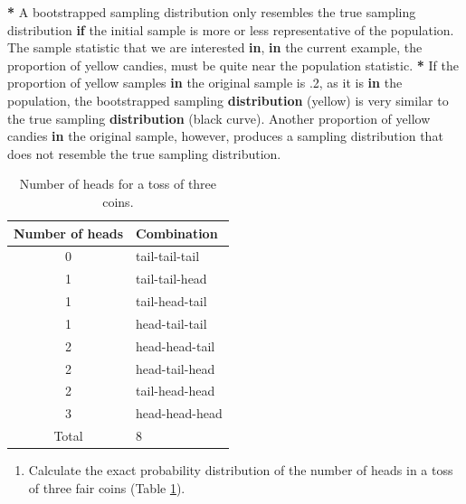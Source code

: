 \documentclass[a4paper]{book}
\newenvironment{Shaded}{\begin{snugshade}}{\end{snugshade}}
\newcommand{\KeywordTok}[1]{\textcolor[rgb]{0,0,0}{\textbf{#1}}}
\newcommand{\DecValTok}[1]{\textcolor[rgb]{0.00,0.00,0.00}{#1}}
\newcommand{\StringTok}[1]{\textcolor[rgb]{0.00,0.00,0.00}{#1}}
\newcommand{\ControlFlowTok}[1]{\textcolor[rgb]{0.00,0.00,0.00}{\textbf{#1}}}
\newcommand{\OperatorTok}[1]{\textcolor[rgb]{0.00,0.00,0.00}{\textbf{#1}}}
\newcommand{\NormalTok}[1]{#1}
\providecommand{\tightlist}{%
  \setlength{\itemsep}{0pt}\setlength{\parskip}{0pt}}
\theoremstyle{definition}
\theoremstyle{definition}
\theoremstyle{definition}
\theoremstyle{remark}
\begin{document}
\begin{Shaded}
\begin{Highlighting}[]
\OperatorTok{*}\StringTok{ }\NormalTok{A bootstrapped sampling distribution only resembles the true sampling}
\NormalTok{distribution }\ControlFlowTok{if}\NormalTok{ the initial sample is more or less representative of the}
\NormalTok{population. The sample statistic that we are interested }\ControlFlowTok{in}\NormalTok{, }\ControlFlowTok{in}\NormalTok{ the current}
\NormalTok{example, the proportion of yellow candies, must be quite near the population}
\NormalTok{statistic.}
\OperatorTok{*}\StringTok{ }\NormalTok{If the proportion of yellow samples }\ControlFlowTok{in}\NormalTok{ the original sample is .}\DecValTok{2}\NormalTok{, as it is}
\ControlFlowTok{in}\NormalTok{ the population, the bootstrapped sampling }\KeywordTok{distribution}\NormalTok{ (yellow) is very}
\NormalTok{similar to the true sampling }\KeywordTok{distribution}\NormalTok{ (black curve). Another proportion of}
\NormalTok{yellow candies }\ControlFlowTok{in}\NormalTok{ the original sample, however, produces a sampling}
\NormalTok{distribution that does not resemble the true sampling distribution.}
\end{Highlighting}
\end{Shaded}

\begin{table}[H]

\caption{\label{tab:models-summary-3}Number of heads for a toss of three coins.}
\centering
\fontsize{8}{8}\selectfont
\begin{tabular}[t]{cl}
\hline
Number of heads & Combination\\
\hline
0 & tail-tail-tail\\
1 & tail-tail-head\\
1 & tail-head-tail\\
1 & head-tail-tail\\
2 & head-head-tail\\
2 & head-tail-head\\
2 & tail-head-head\\
3 & head-head-head\\
\hline
Total & 8\\
\hline
\end{tabular}
\end{table}

\begin{enumerate}
\def\labelenumi{\arabic{enumi}.}
\setcounter{enumi}{3}
\tightlist
\item
  Calculate the exact probability distribution of the number of heads in
  a toss of three fair coins (Table \ref{tab:models-summary-3}).
\end{enumerate}
\end{document}
